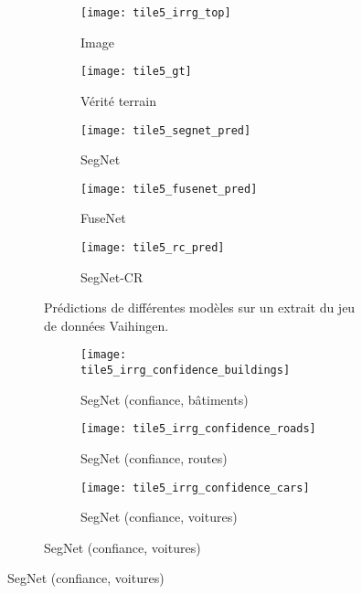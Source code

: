 \begin{figure}[!tb]
	\begin{subfigure}{\textwidth}
    	\captionsetup[subfigure]{singlelinecheck=off,justification=centering}
  		\captionsetup[subfigure]{labelformat=empty}
    	\begin{subfigure}[t]{0.19\textwidth}
        	\texttt{[image: tile5\_irrg\_top]}
      		\caption*{Image }
        \end{subfigure}
        \begin{subfigure}[t]{0.19\textwidth}
        	\texttt{[image: tile5\_gt]}
        	\caption*{Vérité terrain}
        \end{subfigure}
        \begin{subfigure}[t]{0.19\textwidth}
        	\texttt{[image: tile5\_segnet\_pred]}
        	\caption*{SegNet}
        \end{subfigure}
        \begin{subfigure}[t]{0.19\textwidth}
        	\texttt{[image: tile5\_fusenet\_pred]}
        	\caption*{FuseNet}
        \end{subfigure}
        \begin{subfigure}[t]{0.19\textwidth}
        	\texttt{[image: tile5\_rc\_pred]}
        	\caption*{SegNet-CR}
        \end{subfigure}
        \caption{Prédictions de différentes modèles sur un extrait du jeu de données  Vaihingen.}
        \label{fig:fusion_exemple1}
    \end{subfigure}
    	\begin{subfigure}{\textwidth}
    	\captionsetup[subfigure]{singlelinecheck=off,justification=centering}
  		\captionsetup[subfigure]{labelformat=empty}
    	\begin{subfigure}[t]{0.19\textwidth}
        	\texttt{[image: tile5\_irrg\_confidence\_buildings]}
      		\caption*{SegNet  (confiance, bâtiments)}
        \end{subfigure}
        \begin{subfigure}[t]{0.19\textwidth}
        	\texttt{[image: tile5\_irrg\_confidence\_roads]}
        	\caption*{SegNet  (confiance, routes)}
        \end{subfigure}
        \begin{subfigure}[t]{0.19\textwidth}
        	\texttt{[image: tile5\_irrg\_confidence\_cars]}
        	\caption*{SegNet  (confiance, voitures)}

\end{subfigure}
\end{subfigure}
\end{figure}
